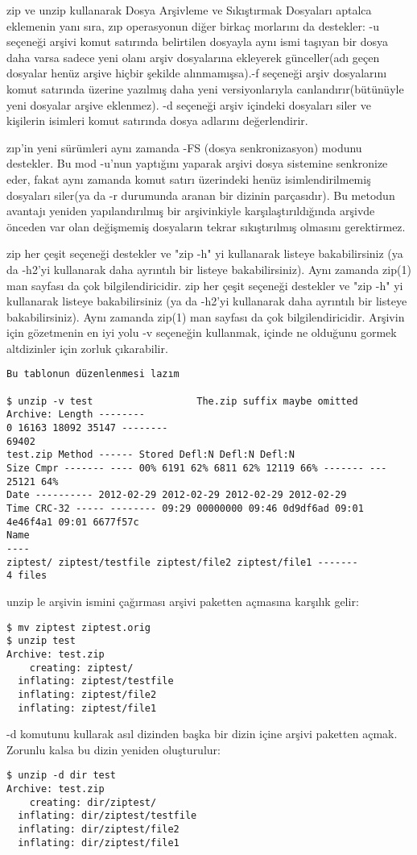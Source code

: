 \begin{section}{zip ve unzip kullanarak Dosya Arşivleme ve Sıkıştırmak}
Dosyaları aptalca eklemenin yanı sıra, zıp operasyonun diğer birkaç morlarını da destekler:  -u seçeneği arşivi komut satırında belirtilen dosyayla aynı ismi taşıyan bir dosya daha varsa sadece yeni olanı arşiv dosyalarına ekleyerek günceller(adı geçen dosyalar henüz arşive hiçbir şekilde alınmamışsa).-f seçeneği arşiv dosyalarını komut satırında üzerine yazılmış daha yeni versiyonlarıyla canlandırır(bütünüyle yeni dosyalar arşive eklenmez). -d seçeneği arşiv içindeki dosyaları siler ve kişilerin isimleri komut satırında dosya adlarını değerlendirir.

zıp'in yeni sürümleri aynı zamanda -FS (dosya senkronizasyon) modunu destekler. Bu mod -u'nun yaptığını yaparak arşivi dosya sistemine senkronize eder, fakat aynı zamanda komut satırı üzerindeki henüz isimlendirilmemiş dosyaları siler(ya da -r durumunda aranan bir dizinin parçasıdır). Bu metodun avantajı yeniden yapılandırılmış bir arşivinkiyle karşılaştırıldığında arşivde önceden var olan değişmemiş dosyaların tekrar sıkıştırılmış olmasını gerektirmez.

zip her çeşit seçeneği destekler ve "zip -h" yi kullanarak listeye bakabilirsiniz (ya da -h2'yi kullanarak daha ayrıntılı bir listeye bakabilirsiniz). Aynı zamanda zip(1) man sayfası da çok bilgilendiricidir.
zip her çeşit seçeneği destekler ve "zip -h" yi kullanarak listeye bakabilirsiniz (ya da -h2'yi kullanarak daha ayrıntılı bir listeye bakabilirsiniz). Aynı zamanda zip(1) man sayfası da çok bilgilendiricidir.
Arşivin için gözetmenin en iyi yolu -v seçeneğin kullanmak, içinde ne olduğunu gormek altdizinler için zorluk çıkarabilir.

\begin{verbatim}
Bu tablonun düzenlenmesi lazım

$ unzip -v test                  The.zip suffix maybe omitted
Archive: Length --------
0 16163 18092 35147 --------
69402
test.zip Method ------ Stored Defl:N Defl:N Defl:N
Size Cmpr ------- ---- 00% 6191 62% 6811 62% 12119 66% ------- ---
25121 64%
Date ---------- 2012-02-29 2012-02-29 2012-02-29 2012-02-29
Time CRC-32 ----- -------- 09:29 00000000 09:46 0d9df6ad 09:01 4e46f4a1 09:01 6677f57c
Name
----
ziptest/ ziptest/testfile ziptest/file2 ziptest/file1 -------
4 files
\end{verbatim}

unzip le arşivin ismini çağırması arşivi paketten açmasına karşılık gelir:
\begin{verbatim}
$ mv ziptest ziptest.orig 
$ unzip test
Archive: test.zip
    creating: ziptest/ 
  inflating: ziptest/testfile 
  inflating: ziptest/file2 
  inflating: ziptest/file1
\end{verbatim}
-d komutunu kullarak asıl dizinden başka bir dizin içine arşivi paketten açmak. Zorunlu kalsa bu dizin yeniden oluşturulur:
\begin{verbatim}
$ unzip -d dir test 
Archive: test.zip
    creating: dir/ziptest/ 
  inflating: dir/ziptest/testfile 
  inflating: dir/ziptest/file2 
  inflating: dir/ziptest/file1
\end{verbatim}


\end{section}
